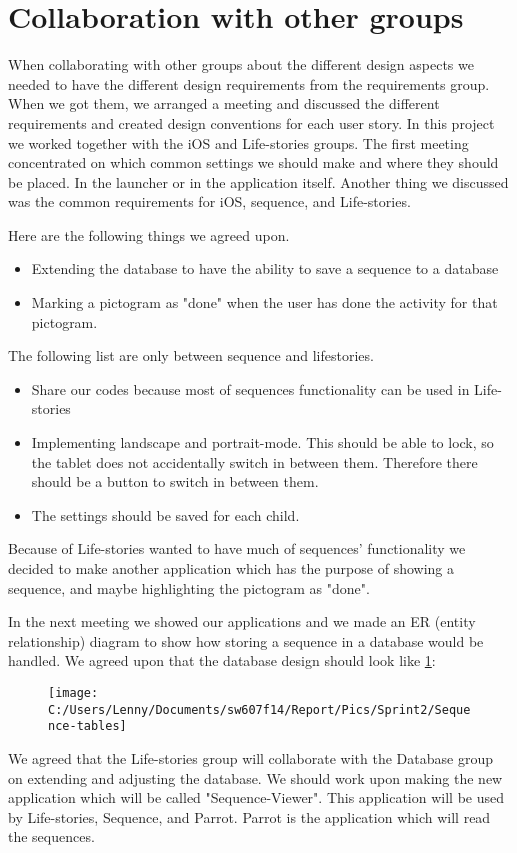 \section{Collaboration with other groups}
\label{sec:collab}
When collaborating with other groups about the different design aspects we needed to have the different design requirements from the requirements group.
When we got them, we arranged a meeting and discussed the different requirements and created design conventions for each user story.
In this project we worked together with the iOS and Life-stories groups.
The first meeting concentrated on which common settings we should make and where they should be placed. In the launcher or in the application itself. 
Another thing we discussed was the common requirements for iOS, sequence, and Life-stories. 

Here are the following things we agreed upon.
\begin{itemize}
\item Extending the database to have the ability to save a sequence to a database
\item Marking a pictogram as "done" when the user has done the activity for that pictogram.
\end{itemize}

The following list are only between sequence and lifestories. 
\begin{itemize}
\item Share our codes because most of sequences functionality can be used in Life-stories
\item Implementing landscape and portrait-mode. This should be able to lock, so the tablet does not accidentally switch in between them. Therefore there should be a button to switch in between them.
\item The settings should be saved for each child.
\end{itemize}

Because of Life-stories wanted to have much of sequences' functionality we decided to make another application which has the purpose of showing a sequence, and maybe highlighting the pictogram as "done".

In the next meeting we showed our applications and we made an ER (entity relationship) diagram to show how storing a sequence in a database would be handled.
We agreed upon that the database design should look like \ref{fig:Sequence-tables}:
\begin{figure}
\centering
\texttt{[image: C:/Users/Lenny/Documents/sw607f14/Report/Pics/Sprint2/Sequence-tables]}
\caption[An ER diagram that should be included into the overall database]{}
\caption{}
\label{fig:Sequence-tables}
\end{figure}
We agreed that the Life-stories group will collaborate with the Database group on extending and adjusting the database.
We should work upon making the new application which will be called "Sequence-Viewer". This application will be used by Life-stories, Sequence, and Parrot. Parrot is the application which will read the sequences. 